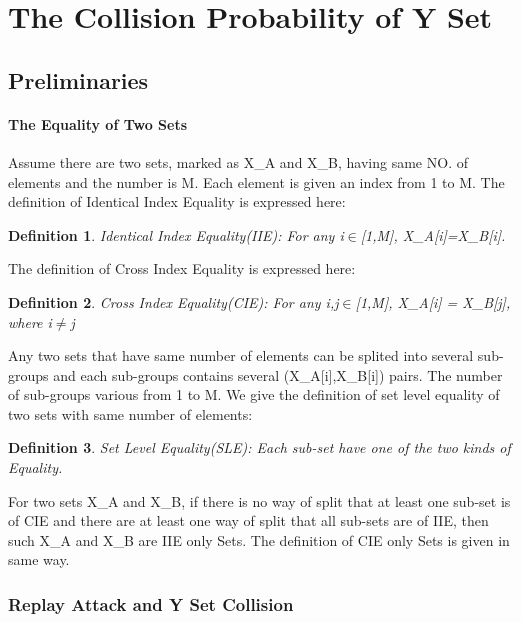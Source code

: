 \documentclass{article}
\newtheorem{defination}{Definition}[section]
\begin{document}
 
\section{The Collision Probability of Y Set}

\subsection{Preliminaries}
\paragraph{The Equality of Two Sets}
Assume there are two sets, marked as X\_A and X\_B, having same NO. of elements and the number is M. Each element is given an index from 1 to M. The definition of Identical Index Equality is expressed here:
\begin{defination}
Identical Index Equality(IIE): For any i$\in$[1,M], X\_A[i]=X\_B[i].
\end{defination}
The definition of Cross Index Equality is expressed here:
\begin{defination}
Cross Index Equality(CIE): For any i,j$\in$[1,M], X\_A[i] = X\_B[j], where i$\neq$j
\end{defination}

Any two sets that have same number of elements can be splited into several sub-groups and each sub-groups contains several (X\_A[i],X\_B[i]) pairs. The number of sub-groups various from 1 to M. We give the definition of set level equality of two sets with same number of elements:
\begin{defination}
Set Level Equality(SLE): Each sub-set have one of the two kinds of Equality.
\end{defination}

For two sets X\_A and X\_B, if there is no way of split that at least one sub-set is of CIE and there are at least one way of split that all sub-sets are of IIE, then such X\_A and X\_B are IIE only Sets. 
The definition of CIE only Sets is given in same way.

\subsubsection{Replay Attack and Y Set Collision}
\end{document}
